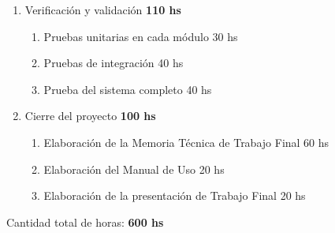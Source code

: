 \documentclass[
11pt, %
]{charter}
\begin{document}
\begin{enumerate}
\begin{enumerate}
	\end{enumerate}
\item Verificación y validación 										\hspace*{\fill}\textbf{110 hs}
	\begin{enumerate}
	\item Pruebas unitarias en cada módulo								\hspace*{\fill}30 hs
	\item Pruebas de integración										\hspace*{\fill}40 hs
	\item Prueba del sistema completo									\hspace*{\fill}40 hs
	\end{enumerate}
\item Cierre del proyecto												\hspace*{\fill}\textbf{100 hs}
	\begin{enumerate}
	\item Elaboración de la Memoria Técnica de Trabajo Final			\hspace*{\fill}60 hs
	\item Elaboración del Manual de Uso									\hspace*{\fill}20 hs
	\item Elaboración de la presentación de Trabajo Final 				\hspace*{\fill}20 hs
	\end{enumerate}
\end{enumerate}

Cantidad total de horas: 												\hspace*{\fill}\textbf{600 hs}
\end{document}
